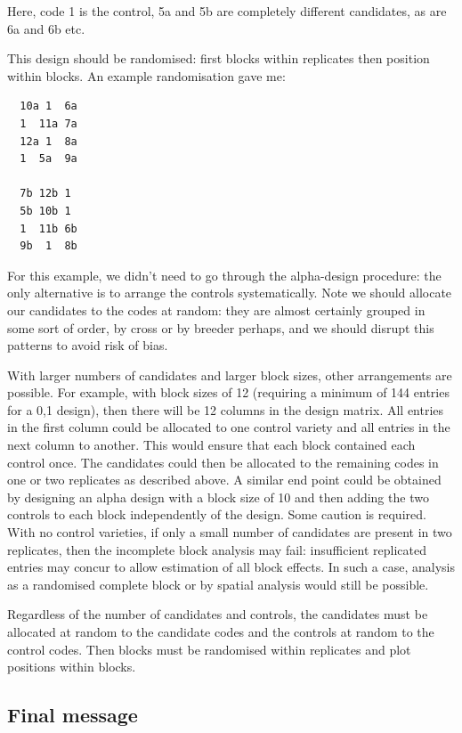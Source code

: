 \documentclass[
]{book}
\begin{document}
Here, code 1 is the control, 5a and 5b are completely different candidates, as are 6a and 6b etc.

This design should be randomised: first blocks within replicates then position within blocks. An example randomisation gave me:

\begin{verbatim}
  10a 1  6a
  1  11a 7a
  12a 1  8a
  1  5a  9a
    
  7b 12b 1
  5b 10b 1
  1  11b 6b
  9b  1  8b 
\end{verbatim}

For this example, we didn't need to go through the alpha-design procedure: the only alternative is to arrange the controls systematically. Note we should allocate our candidates to the codes at random: they are almost certainly grouped in some sort of order, by cross or by breeder perhaps, and we should disrupt this patterns to avoid risk of bias.

With larger numbers of candidates and larger block sizes, other arrangements are possible. For example, with block sizes of 12 (requiring a minimum of 144 entries for a 0,1 design), then there will be 12 columns in the design matrix. All entries in the first column could be allocated to one control variety and all entries in the next column to another. This would ensure that each block contained each control once. The candidates could then be allocated to the remaining codes in one or two replicates as described above. A similar end point could be obtained by designing an alpha design with a block size of 10 and then adding the two controls to each block independently of the design. Some caution is required. With no control varieties, if only a small number of candidates are present in two replicates, then the incomplete block analysis may fail: insufficient replicated entries may concur to allow estimation of all block effects. In such a case, analysis as a randomised complete block or by spatial analysis would still be possible.

Regardless of the number of candidates and controls, the candidates must be allocated at random to the candidate codes and the controls at random to the control codes. Then blocks must be randomised within replicates and plot positions within blocks.

\hypertarget{final-message}{%
\subsection{Final message}\label{final-message}}
\end{document}
